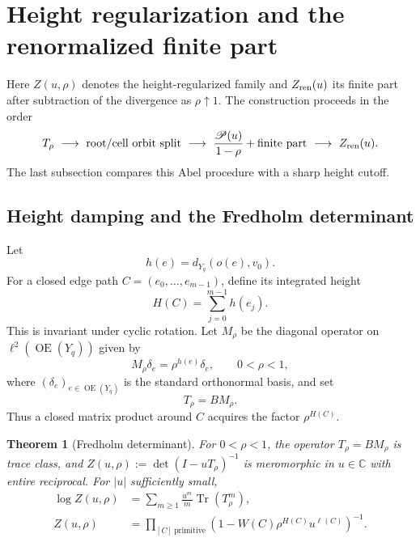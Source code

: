 \documentclass[11pt,reqno]{amsart}
\numberwithin{equation}{section}
\newtheorem{theorem}{Theorem}[section]
\theoremstyle{definition}
\theoremstyle{remark}
\newcommand{\OrE}{\operatorname{OE}}
\newcommand{\Tr}{\operatorname{Tr}}
\begin{document}
\section{Height regularization and the renormalized finite part}
\label{sec:regularized}

Here $Z(u,\rho)$ denotes the height-regularized family and $Z_{\rm ren}(u)$
its finite part after subtraction of the divergence as $\rho\uparrow1$.  The
construction proceeds in the order
\[
 T_\rho\ \longrightarrow\
 \text{root/cell orbit split}\ \longrightarrow\
 \frac{\mathscr P(u)}{1-\rho}+\text{finite part}\ \longrightarrow\
 Z_{\rm ren}(u).
\]
The last subsection compares this Abel procedure with a sharp height cutoff.

\subsection{Height damping and the Fredholm determinant}

Let
\[
 h(e)=d_{Y_q}(o(e),v_0).
\]
For a closed edge path $C=(e_0,\ldots,e_{m-1})$, define its integrated height
\begin{equation}\label{eq:integratedheight}
 H(C)=\sum_{j=0}^{m-1}h(e_j).
\end{equation}
This is invariant under cyclic rotation.  Let $M_\rho$ be the diagonal operator
on $\ell^2(\OrE(Y_q))$ given by
\[
 M_\rho\delta_e=\rho^{h(e)}\delta_e,
 \qquad0<\rho<1,
\]
where $(\delta_e)_{e\in\OrE(Y_q)}$ is the standard orthonormal basis, and set
\begin{equation}\label{eq:Trho}
 T_\rho=BM_\rho.
\end{equation}
Thus a closed matrix product around $C$ acquires the factor $\rho^{H(C)}$.

\begin{theorem}[Fredholm determinant]\label{thm:fredholm}
For $0<\rho<1$, the operator $T_\rho=BM_\rho$ is trace class, and
$Z(u,\rho):=\det(I-uT_\rho)^{-1}$ is meromorphic in $u\in\mathbb C$ with
entire reciprocal.  For $|u|$ sufficiently small,
\begin{align}
 \log Z(u,\rho)
 &=\sum_{m\ge1}\frac{u^m}{m}\Tr(T_\rho^m),\label{eq:traceexpansion}\\
 Z(u,\rho)
 &=\prod_{[C]\ \mathrm{primitive}}
 \left(1-W(C)\rho^{H(C)}u^{\ell(C)}\right)^{-1}.
\label{eq:regularizedeuler}
\end{align}
\end{theorem}
\end{document}
